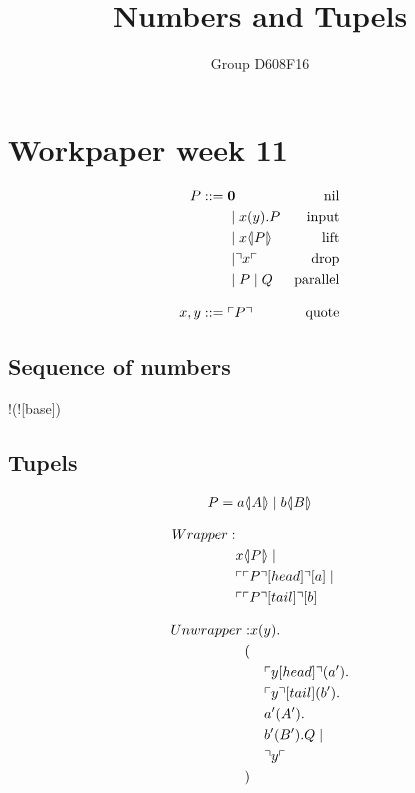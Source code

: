 

\author{Group D608F16}
\title{Numbers and Tupels}



\maketitle

\section{Workpaper week 11}

\begin{align*}
P  ::= \; &  \mathbf{0} & \text{nil} \\
  & \mid x(y).P & \text{input} \\
  & \mid x \langle \! | P | \! \rangle & \text{lift} \\
  & \mid \urcorner x \ulcorner & \text{drop} \\
  & \mid P \mid Q & \text{parallel} \\[3mm]
x,y ::= \; & \ulcorner P \urcorner & \text{quote}
\end{align*}
\citep{Meredith2005}



\subsection{Sequence of numbers}
!(![base]\para {})

\subsection{Tupels}
\begin{align*}
P=a \langle \! | A | \! \rangle\mid b \langle \! | B | \! \rangle
\end{align*}



\begin{align*}
Wrapper:
\\ & x \langle \! | P | \! \rangle\mid
\\ & \ulcorner \ulcorner P \urcorner[head] \urcorner[a]\mid
\\ & \ulcorner \ulcorner P \urcorner[tail] \urcorner[b]
\end{align*}

\begin{align*}
Unwrapper: &x(y).\\
(\\
&\quad \ulcorner y[head] \urcorner(a').\\
&\quad \ulcorner y \urcorner[tail](b').\\
&\quad a'(A').\\
&\quad b'(B').Q\mid\\
&\quad \urcorner y \ulcorner\\
)
\end{align*}





\grid
\grid
